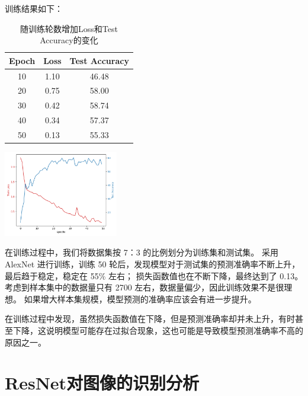 \documentclass[UTF8]{ctexart}
\begin{document}
训练结果如下：
\begin{table}[H]
    \begin{minipage}[b]{0.56\linewidth}
    \centering
    \begin{tabular}{c|c|c}
        \hline
        Epoch & Loss & Test Accuracy \\ \hline \hline
        10 & 1.10 & 46.48 \\ \hline
        20 & 0.75 & 58.00 \\ \hline
        30 & 0.42 & 58.74 \\ \hline
        40 & 0.34 & 57.37 \\ \hline
        50 & 0.13 & 55.33 \\ \hline
       \end{tabular}
        \caption{随训练轮数增加Loss和Test Accuracy的变化}
    \end{minipage}
    \begin{minipage}[b]{0.4\linewidth}
    \centering
    \includegraphics[width=50mm]{../AlexNet/AlexNet.png}
    \end{minipage}
    \end{table}



在训练过程中，我们将数据集按 7：3 的比例划分为训练集和测试集。
采用 AlexNet 进行训练，训练 50 轮后，发现模型对于测试集的预测准确率不断上升，最后趋于稳定，稳定在 55\% 左右；
损失函数值也在不断下降，最终达到了 0.13。考虑到样本集中的数据量只有 2700 左右，数据量偏少，因此训练效果不是很理想。
如果增大样本集规模，模型预测的准确率应该会有进一步提升。 \par
在训练过程中发现，虽然损失函数值在下降，但是预测准确率却并未上升，有时甚至下降，这说明模型可能存在过拟合现象，这也可能是导致模型预测准确率不高的原因之一。

\section{ResNet对图像的识别分析}
\end{document}
